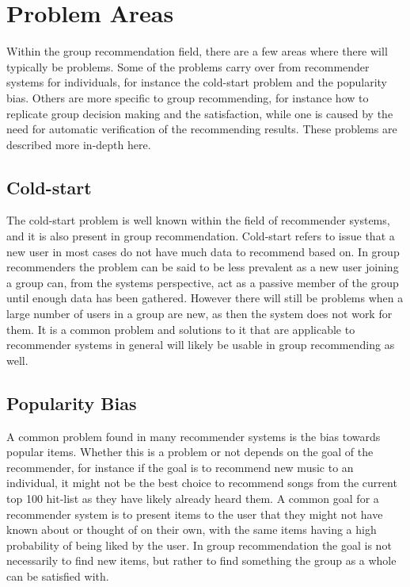 \section{Problem Areas}

Within the group recommendation field, there are a few areas where there will typically be problems. Some of the problems carry over from recommender systems for individuals, for instance the cold-start problem and the popularity bias. Others are more specific to group recommending, for instance how to replicate group decision making and the satisfaction, while one is caused by the need for automatic verification of the recommending results. These problems are described more in-depth here. 

\subsection{Cold-start}
The cold-start problem is well known within the field of recommender systems, and it is also present in group recommendation. Cold-start refers to issue that a new user in most cases do not have much data to recommend based on. In group recommenders the problem can be said to be less prevalent as a new user joining a group can, from the systems perspective, act as a passive member of the group until enough data has been gathered. However there will still be problems when a large number of users in a group are new, as then the system does not work for them. It is a common problem and solutions to it that are applicable to recommender systems in general will likely be usable in group recommending as well.

\subsection{Popularity Bias}
A common problem found in many recommender systems is the bias towards popular items. Whether this is a problem or not depends on the goal of the recommender, for instance if the goal is to recommend new music to an individual, it might not be the best choice to recommend songs from the current top 100 hit-list as they have likely already heard them. A common goal for a recommender system is to present items to the user that they might not have known about or thought of on their own, with the same items having a high probability of being liked by the user. In group recommendation the goal is not necessarily to find new items, but rather to find something the group as a whole can be satisfied with.

